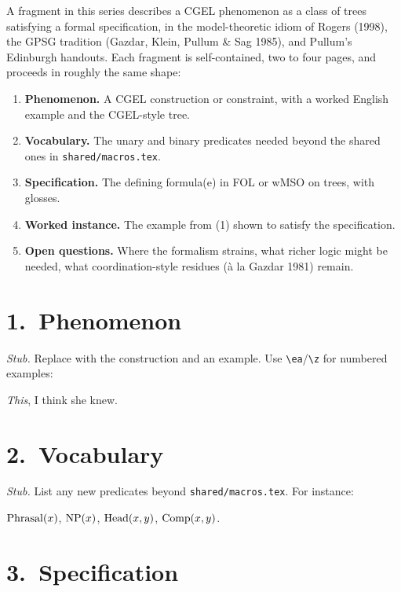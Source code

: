 \documentclass[11pt]{article}
\begin{document}
\fragmenthead

\noindent
A fragment in this series describes a CGEL phenomenon as a class of trees
satisfying a formal specification, in the model-theoretic idiom of Rogers
(1998), the GPSG tradition (Gazdar, Klein, Pullum \& Sag 1985), and Pullum's
Edinburgh handouts. Each fragment is self-contained, two to four pages, and
proceeds in roughly the same shape:

\begin{enumerate}[label=(\arabic*),leftmargin=2em,itemsep=0.2em]
  \item \textbf{Phenomenon.} A CGEL construction or constraint, with a
        worked English example and the CGEL-style tree.
  \item \textbf{Vocabulary.} The unary and binary predicates needed
        beyond the shared ones in \texttt{shared/macros.tex}.
  \item \textbf{Specification.} The defining formula(e) in FOL or wMSO
        on trees, with glosses.
  \item \textbf{Worked instance.} The example from (1) shown to satisfy
        the specification.
  \item \textbf{Open questions.} Where the formalism strains, what
        richer logic might be needed, what coordination-style residues
        (à la Gazdar 1981) remain.
\end{enumerate}

\section*{1.~Phenomenon}

\textit{Stub.} Replace with the construction and an example. Use \texttt{\textbackslash ea}/\texttt{\textbackslash z} for numbered examples:

\ea
\textit{This}, I think she knew.
\z

\section*{2.~Vocabulary}

\textit{Stub.} List any new predicates beyond \texttt{shared/macros.tex}.
For instance:

\ea
$\mathrm{Phrasal}(x)$, $\mathrm{NP}(x)$, $\mathrm{Head}(x,y)$, $\mathrm{Comp}(x,y)$.
\z

\section*{3.~Specification}
\end{document}
